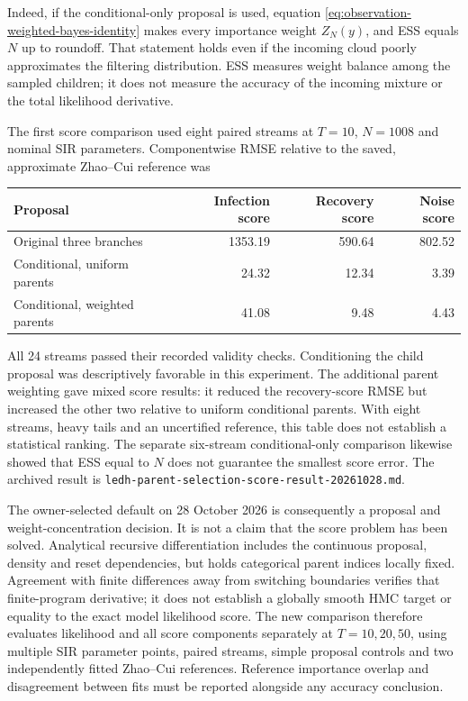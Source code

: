 Indeed, if the conditional-only proposal is used, equation
\eqref{eq:observation-weighted-bayes-identity} makes every importance weight
$Z_N(y)$, and ESS equals $N$ up to roundoff. That statement holds even if the
incoming cloud poorly approximates the filtering distribution. ESS measures
weight balance among the sampled children; it does not measure the accuracy
of the incoming mixture or the total likelihood derivative.

The first score comparison used eight paired streams at $T=10$, $N=1008$
and nominal SIR parameters. Componentwise RMSE relative to the saved,
approximate Zhao--Cui reference was
\begin{center}
\begin{tabular}{lrrr}
\hline
Proposal & Infection score & Recovery score & Noise score\\\hline
Original three branches & 1353.19 & 590.64 & 802.52\\
Conditional, uniform parents & 24.32 & 12.34 & 3.39\\
Conditional, weighted parents & 41.08 & 9.48 & 4.43\\\hline
\end{tabular}
\end{center}
All 24 streams passed their recorded validity checks. Conditioning the child
proposal was descriptively favorable in this experiment. The additional parent
weighting gave mixed score results: it reduced the recovery-score RMSE but
increased the other two relative to uniform conditional parents. With eight
streams, heavy tails and an uncertified reference, this table does not
establish a statistical ranking. The separate six-stream conditional-only
comparison likewise showed that ESS equal to $N$ does not guarantee the
smallest score error. The archived result is
\texttt{ledh-parent-selection-score-result-20261028.md}.

The owner-selected default on 28 October 2026 is consequently a proposal and
weight-concentration decision. It is not a claim that the score problem has
been solved. Analytical recursive differentiation includes the continuous
proposal, density and reset dependencies, but holds categorical parent indices
locally fixed. Agreement with finite differences away from switching boundaries
verifies that finite-program derivative; it does not establish a globally smooth
HMC target or equality to the exact model likelihood score. The new comparison
therefore evaluates likelihood and all score components separately at
$T=10,20,50$, using multiple SIR parameter points, paired streams, simple
proposal controls and two independently fitted Zhao--Cui references. Reference
importance overlap and disagreement between fits must be reported alongside
any accuracy conclusion.


